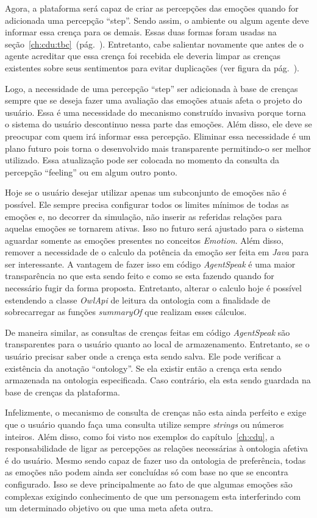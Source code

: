 Agora, a plataforma \jason será capaz de criar as percepções das emoções
quando for adicionada uma percepção ``step''. Sendo assim, o ambiente ou algum
agente deve informar essa crença para os demais.  Essas duas formas foram
usadas na seção~\ref{ch:cdu:tbc}~(pág.~\pageref{ch:cdu:tbc}). Entretanto, cabe
salientar novamente que antes de o agente acreditar que essa crença foi
recebida ele deveria limpar as crenças existentes sobre seus sentimentos para
evitar duplicações (ver figura da pág.~\pageref{fig:testeJasonIntBase}).

Logo, a necessidade de uma percepção ``step'' ser adicionada à base de crenças
sempre que se deseja fazer uma avaliação das emoções atuais afeta o projeto do
usuário. Essa é uma necessidade do mecanismo construído invasiva porque torna
o sistema do usuário descontinuo nessa parte das emoções. Além disso, ele deve
se preocupar com quem irá informar essa percepção. Eliminar essa necessidade é
um plano futuro pois torna o desenvolvido mais transparente permitindo-o ser
melhor utilizado. Essa atualização pode ser colocada no momento da consulta da
percepção ``feeling'' ou em algum outro ponto.

Hoje se o usuário desejar utilizar apenas um subconjunto de emoções não é
possível. Ele sempre precisa configurar todos os limites mínimos de todas as
emoções e, no decorrer da simulação, não inserir as referidas relações para
aquelas emoções se tornarem ativas. Isso no futuro será ajustado para o
sistema aguardar somente as emoções presentes no conceitos \emph{Emotion}.
Além disso, remover a necessidade de o calculo da potência da emoção ser feita
em \emph{Java} para ser interessante. A vantagem de fazer isso em código
\emph{AgentSpeak} é uma maior transparência no que esta sendo feito e como se
esta fazendo quando for necessário fugir da forma proposta. Entretanto,
alterar o calculo hoje é possível estendendo a classe \emph{OwlApi} de leitura
da ontologia com a finalidade de sobrecarregar as funções \emph{summaryOf} que
realizam esses cálculos.

De maneira similar, as consultas de crenças feitas em código \emph{AgentSpeak}
são transparentes para o usuário quanto ao local de armazenamento. Entretanto,
se o usuário precisar saber onde a crença esta sendo salva. Ele pode verificar
a existência da anotação ``ontology''. Se ela existir então a crença esta
sendo armazenada na ontologia especificada. Caso contrário, ela esta sendo
guardada na base de crenças da plataforma.

Infelizmente, o mecanismo de consulta de crenças não esta ainda perfeito e
exige que o usuário quando faça uma consulta utilize sempre \emph{strings} ou
números inteiros. Além disso, como foi visto nos exemplos do
capítulo~\ref{ch:cdu}, a responsabilidade de ligar as percepções as relações
necessárias à ontologia afetiva é do usuário. Mesmo sendo capaz de fazer uso
da ontologia de preferência, todas as emoções não podem ainda ser concluídas
só com base no que se encontra configurado. Isso se deve principalmente ao
fato de que algumas emoções são complexas exigindo conhecimento de que um
personagem esta interferindo com um determinado objetivo ou que uma meta afeta
outra.

